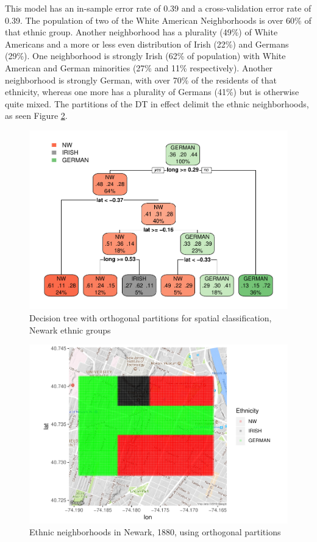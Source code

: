 \documentclass[]{elsarticle} %
\makeatletter
\def\maxwidth{\ifdim\Gin@nat@width>\linewidth\linewidth
\else\Gin@nat@width\fi}
\let\Oldincludegraphics\includegraphics
\renewcommand{\includegraphics}[1]{\Oldincludegraphics[width=\maxwidth]{#1}}
\makeatother
\begin{document}
This model has an in-sample error rate of 0.39 and a cross-validation
error rate of 0.39. The population of two of the White American
Neighborhoods is over 60\% of that ethnic group. Another neighborhood
has a plurality (49\%) of White Americans and a more or less even
distribution of Irish (22\%) and Germans (29\%). One neighborhood is
strongly Irish (62\% of population) with White American and German
minorities (27\% and 11\% respectively). Another neighborhood is
strongly German, with over 70\% of the residents of that ethnicity,
whereas one more has a plurality of Germans (41\%) but is otherwise
quite mixed. The partitions of the DT in effect delimit the ethnic
neighborhoods, as seen Figure \ref{fig:fig18-map-orthogonal-newark}.

\begin{figure}[htbp]
\centering
\includegraphics{Trees_with_Base_Functions_v2_files/figure-latex/fig17-tree-orthogonal-newark-1.pdf}
\caption{\label{fig:fig17-tree-orthogonal-newark}Decision tree with
orthogonal partitions for spatial classification, Newark ethnic groups}
\end{figure}

\begin{figure}[htbp]
\centering
\includegraphics{Trees_with_Base_Functions_v2_files/figure-latex/fig18-map-orthogonal-newark-1.pdf}
\caption{\label{fig:fig18-map-orthogonal-newark}Ethnic neighborhoods in
Newark, 1880, using orthogonal partitions}
\end{figure}
\end{document}
